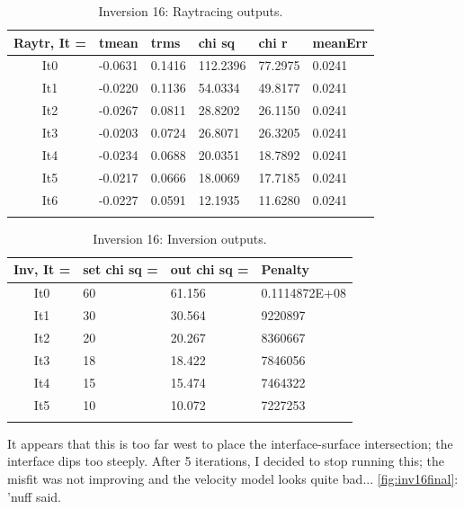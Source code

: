 \documentclass[fontsize=11pt, %
                             paper=a4, %
                             twoside, %
                             captions=tableheading,
                             index=totoc,
                             hyperref]{labbook}
\begin{document}
\begin{addmargin}[4cm]{0cm}
\begin{table}[!ht]
\label{tab:r16}
\raggedleft
\begin{tabular}{c l l l l l}
\toprule
\textbf{Raytr, It = } & \textbf{tmean} & \textbf{trms} & \textbf{chi sq} & \textbf{chi r} & \textbf{meanErr} \\
\toprule
It0 & -0.0631 & 0.1416 & 112.2396 & 77.2975 & 0.0241\\
It1 & -0.0220 & 0.1136 & 54.0334 & 49.8177 & 0.0241\\
It2 & -0.0267 & 0.0811 & 28.8202 & 26.1150 & 0.0241\\
It3 & -0.0203 & 0.0724 & 26.8071 & 26.3205 & 0.0241\\
It4 & -0.0234 & 0.0688 & 20.0351 & 18.7892 & 0.0241\\
It5 & -0.0217 & 0.0666 & 18.0069 & 17.7185 & 0.0241\\
It6 & -0.0227 & 0.0591 & 12.1935 & 11.6280 & 0.0241\\
\bottomrule\\
\end{tabular}
\caption{Inversion 16: Raytracing outputs.}
\end{table}

\begin{table}[!ht]
\label{tab:i16}
\raggedleft
\begin{tabular}{c l l l}
\toprule
\textbf{Inv, It = } & \textbf{set chi sq =} & \textbf{out chi sq =} & \textbf{Penalty} \\
\toprule
It0 & 60 &  61.156 & 0.1114872E+08\\
It1 & 30 & 30.564 & 9220897\\
It2 & 20 & 20.267 & 8360667\\
It3 & 18 & 18.422 & 7846056\\
It4 & 15 & 15.474 & 7464322\\
It5 & 10 & 10.072 & 7227253\\
\bottomrule\\
\end{tabular}
\caption{Inversion 16: Inversion outputs.}
\end{table}

It appears that this is too far west to place the interface-surface intersection; the interface dips too steeply.  After 5 iterations, I decided to stop running this; the misfit was not improving and the velocity model looks quite bad... \autoref{fig:inv16final}: 'nuff said. 


\end{addmargin}
\end{document}
